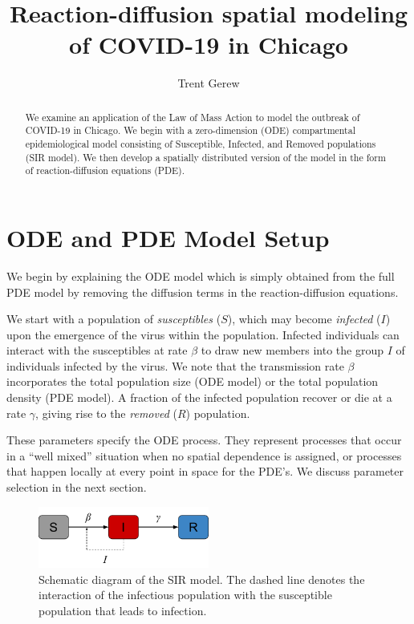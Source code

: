 \documentclass[11pt]{article}
\title{Reaction-diffusion spatial modeling of COVID-19 in Chicago}
\author{Trent Gerew}
\begin{document}
\maketitle

\begin{abstract}
	We examine an application of the Law of Mass Action to model the outbreak of COVID-19 in Chicago.
	We begin with a zero-dimension (ODE) compartmental epidemiological model consisting of Susceptible, Infected, and Removed populations (SIR model).
	We then develop a spatially distributed version of the model in the form of reaction-diffusion equations (PDE).
\end{abstract}

\section{ODE and PDE Model Setup}
We begin by explaining the ODE model which is simply obtained from the full PDE model by removing the diffusion terms in the reaction-diffusion equations.

We start with a population of \textit{susceptibles} ($S$), which may become \textit{infected} ($I$) upon the emergence of the virus within the population.
Infected individuals can interact with the susceptibles at rate $\beta$ to draw new members into the group $I$ of individuals infected by the virus.
We note that the transmission rate $\beta$ incorporates the total population size (ODE model) or the total population density (PDE model).
A fraction of the infected population recover or die at a rate $\gamma$, giving rise to the \textit{removed} ($R$) population.

These parameters specify the ODE process.
They represent processes that occur in a ``well mixed'' situation when no spatial dependence is assigned,
or processes that happen locally at every point in space for the PDE's.
We discuss parameter selection in the next section.

\begin{figure}[h]
	\centering
	\includegraphics[width=0.5\textwidth]{sir_schematic}
	\caption{Schematic diagram of the SIR model. The dashed line denotes the interaction of the infectious population with the susceptible population that leads to infection.}
	\label{fig:schematic}
\end{figure}
\end{document}
